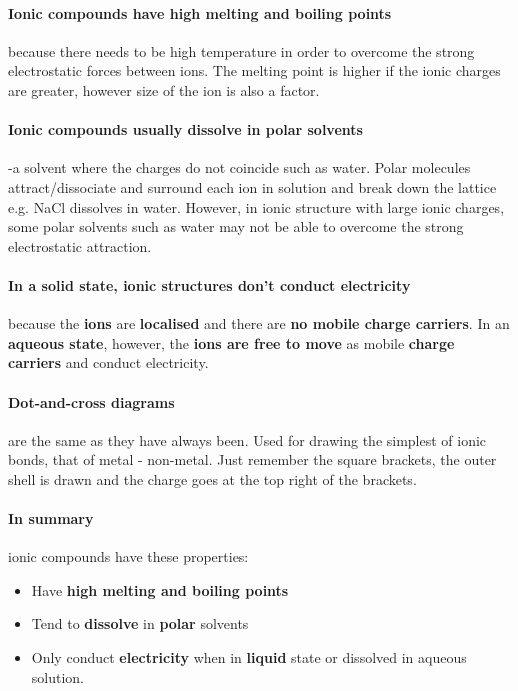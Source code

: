     \paragraph{Ionic compounds have high melting and boiling points} because there needs to be high temperature in order to overcome the strong electrostatic forces between ions.
    The melting point is higher if the ionic charges are greater, however size of the ion is also a factor.
    \paragraph{Ionic compounds usually dissolve in polar solvents}-a solvent where the charges do not coincide such as water. Polar molecules attract/dissociate and surround each ion in solution and break down the lattice e.g. NaCl dissolves in water.
    However, in ionic structure with large ionic charges, some polar solvents such as water may not be able to overcome the strong electrostatic attraction.
    \paragraph{ In a solid state, ionic structures don't conduct electricity} because the \textbf{ions} are \textbf{localised} and there are \textbf{no mobile charge carriers}.
    In an \textbf{aqueous state}, however, the \textbf{ions are free to move} as mobile \textbf{charge carriers} and conduct electricity.
   \paragraph{Dot-and-cross diagrams} are the same as they have always been.
	Used for drawing the simplest of ionic bonds, that of metal - non-metal.
	Just remember the square brackets, the outer shell is drawn and the charge goes at the top right of the brackets.
  \pagebreak
  \paragraph{In summary} ionic compounds have these properties:
    \begin{itemize}
		\item Have \textbf{high melting and boiling points}
		\item Tend to \textbf{dissolve} in \textbf{polar} solvents
		\item Only conduct \textbf{electricity} when in \textbf{liquid} state or dissolved in aqueous solution.
	\end{itemize}
 
